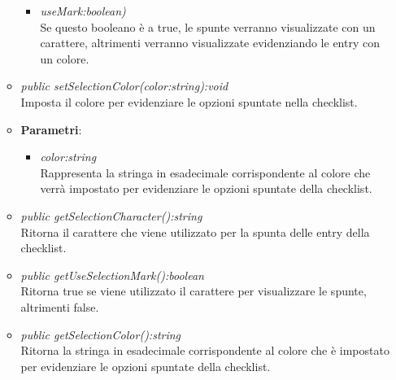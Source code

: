 \begin{itemize}
\begin{itemize}
{\begin{itemize}
		\item \textit{useMark:boolean)}\\
		Se questo booleano è a true, le spunte verranno visualizzate con un carattere, altrimenti verranno visualizzate evidenziando le entry con un colore.
		\end{itemize}}
	\item \textit{public setSelectionColor(color:string):void}\\
	Imposta il colore per evidenziare le opzioni spuntate nella checklist.
		\item{\textbf{Parametri}: \begin{itemize}
		\item \textit{color:string}\\
		Rappresenta la stringa in esadecimale corrispondente al colore che verrà impostato per evidenziare le opzioni spuntate della checklist.
		\end{itemize}}
	\item \textit{public getSelectionCharacter():string}\\
	Ritorna il carattere che viene utilizzato per la spunta delle entry della checklist.
	\item \textit{public getUseSelectionMark():boolean}\\
	Ritorna true se viene utilizzato il carattere per visualizzare le spunte, altrimenti false.
	\item \textit{public getSelectionColor():string}\\
	Ritorna la stringa in esadecimale corrispondente al colore che è impostato per evidenziare le opzioni spuntate della checklist.
	\end{itemize}
\end{itemize}

